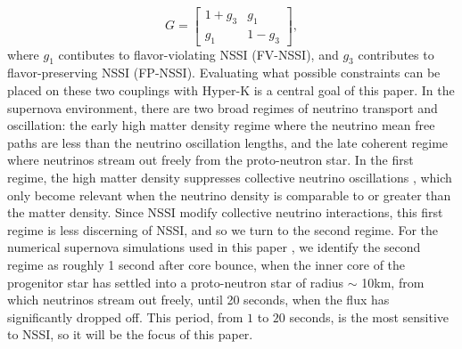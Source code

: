 \documentclass[a4paper,12pt]{article}
\begin{document}
\begin{equation}
    G = \begin{bmatrix}
        1 + g_{3} & g_{1} \\
        g_{1} & 1 - g_{3}
     \end{bmatrix},
\end{equation}
where $g_{1}$ contibutes to flavor-violating NSSI (FV-NSSI), and $g_{3}$ contributes to flavor-preserving NSSI (FP-NSSI). Evaluating what possible constraints can be placed on these two couplings with Hyper-K is a central goal of this paper. 
\vskip 0.15in
In the supernova environment, there are two broad regimes of neutrino transport and oscillation: the early high matter density regime where the neutrino mean free paths are less than the neutrino oscillation lengths, and the late coherent regime where neutrinos stream out freely from the proto-neutron star. In the first regime, the high matter density suppresses collective neutrino oscillations \cite{Chakraborty:2011gd}, which only become relevant when the neutrino density is comparable to or greater than the matter density. Since NSSI modify collective neutrino interactions, this first regime is less discerning of NSSI, and so we turn to the second regime. For the numerical supernova simulations used in this paper \cite{Nakazato:2012qf}, we identify the second regime as roughly 1 second after core bounce, when the inner core of the progenitor star has settled into a proto-neutron star of radius $\sim$ 10km, from which neutrinos stream out freely, until 20 seconds, when the flux has significantly dropped off. This period, from $1$ to $20$ seconds, is the most sensitive to NSSI, so it will be the focus of this paper.
\end{document}
